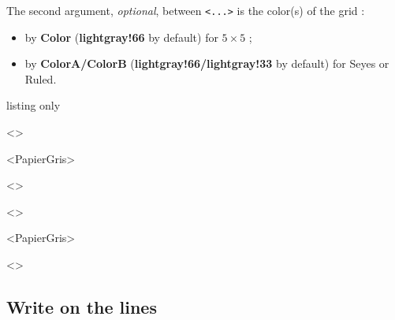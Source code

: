 \documentclass[a4paper]{article}
\newcommand\Cle[1]{{\bfseries\sffamily\textlangle #1\textrangle}}
\begin{document}
The second argument, \textit{optional}, between \texttt{<...>} is the color(s) of the grid :

\begin{itemize}
	\item by \Cle{Color} (\Cle{lightgray!66} by default) for $5\times5$  ;
	\item by \Cle{ColorA/ColorB} (\Cle{lightgray!66/lightgray!33} by default) for Seyes or Ruled.
\end{itemize}

\medskip

\begin{PresentationCode}{listing only}
\begin{EnvGrid}[NumSquares=18x4,Grid=Seyes,Margin=3]<\ColSeyes>
\end{EnvGrid}

\begin{EnvGrid}[NumSquares=36x8,Enlarge=3/3]<PapierGris>
\end{EnvGrid}

\begin{center}
	\begin{EnvGrid}[NumSquares=12x3,Grid=Ruled,Margin=2]<\ColRuled>
	\end{EnvGrid}
\end{center}
\end{PresentationCode}

\medskip

\begin{EnvGrid}[NumSquares=18x4,Grid=Seyes,Margin=3]<\ColSeyes>
\end{EnvGrid}

\smallskip

\begin{EnvGrid}[NumSquares=36x8,Enlarge=3/3]<PapierGris>
\end{EnvGrid}

\smallskip

\begin{center}
	\begin{EnvGrid}[NumSquares=12x3,Grid=Ruled,Margin=2]<\ColRuled>
	\end{EnvGrid}
\end{center}

\pagebreak

\subsection{Write on the lines}
\end{document}
